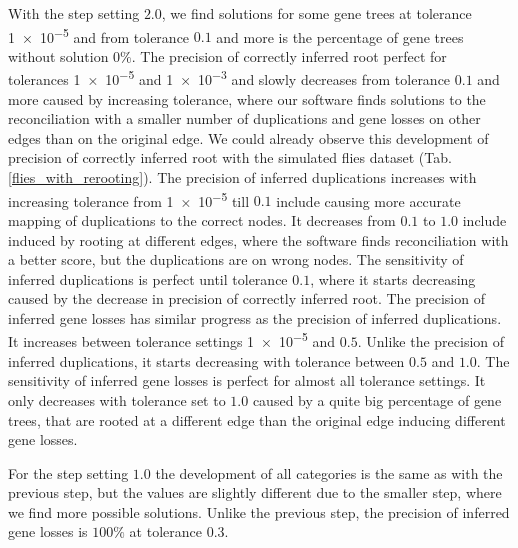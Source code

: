 With the step setting $2.0$, we find solutions for some gene trees at tolerance \num{1e-5} and from tolerance $0.1$ and more is the percentage of gene trees without solution $0\%$. The precision of correctly inferred root perfect for tolerances \num{1e-5} and \num{1e-3} and slowly decreases from tolerance $0.1$ and more caused by increasing tolerance, where our software finds solutions to the reconciliation with a smaller number of duplications and gene losses on other edges than on the original edge. We could already observe this development of precision of correctly inferred root with the simulated flies dataset (Tab. \ref{flies_with_rerooting}). The precision of inferred duplications increases with increasing tolerance from \num{1e-5} till $0.1$ include causing more accurate mapping of duplications to the correct nodes. It decreases from $0.1$ to $1.0$ include induced by rooting at different edges, where the software finds reconciliation with a better score, but the duplications are on wrong nodes. The sensitivity of inferred duplications is perfect until tolerance $0.1$, where it starts decreasing caused by the decrease in precision of correctly inferred root. The precision of inferred gene losses has similar progress as the precision of inferred duplications. It increases between tolerance settings \num{1e-5} and $0.5$. Unlike the precision of inferred duplications, it starts decreasing with tolerance between $0.5$ and $1.0$. The sensitivity of inferred gene losses is perfect for almost all tolerance settings. It only decreases with tolerance set to $1.0$ caused by a quite big percentage of gene trees, that are rooted at a different edge than the original edge inducing different gene losses.

For the step setting $1.0$ the development of all categories is the same as with the previous step, but the values are slightly different due to the smaller step, where we find more possible solutions. Unlike the previous step, the precision of inferred gene losses is $100\%$ at tolerance $0.3$.

